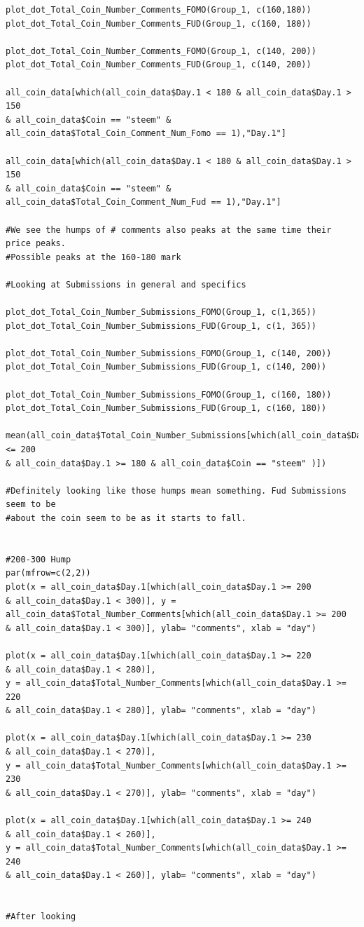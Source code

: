 \documentclass[12pt]{article}
\begin{document}
{\begin{verbatim}
plot_dot_Total_Coin_Number_Comments_FOMO(Group_1, c(160,180))
plot_dot_Total_Coin_Number_Comments_FUD(Group_1, c(160, 180))

plot_dot_Total_Coin_Number_Comments_FOMO(Group_1, c(140, 200))
plot_dot_Total_Coin_Number_Comments_FUD(Group_1, c(140, 200))

all_coin_data[which(all_coin_data$Day.1 < 180 & all_coin_data$Day.1 > 150 
& all_coin_data$Coin == "steem" & all_coin_data$Total_Coin_Comment_Num_Fomo == 1),"Day.1"]

all_coin_data[which(all_coin_data$Day.1 < 180 & all_coin_data$Day.1 > 150 
& all_coin_data$Coin == "steem" & all_coin_data$Total_Coin_Comment_Num_Fud == 1),"Day.1"]

#We see the humps of # comments also peaks at the same time their price peaks. 
#Possible peaks at the 160-180 mark

#Looking at Submissions in general and specifics

plot_dot_Total_Coin_Number_Submissions_FOMO(Group_1, c(1,365))
plot_dot_Total_Coin_Number_Submissions_FUD(Group_1, c(1, 365))

plot_dot_Total_Coin_Number_Submissions_FOMO(Group_1, c(140, 200))
plot_dot_Total_Coin_Number_Submissions_FUD(Group_1, c(140, 200))

plot_dot_Total_Coin_Number_Submissions_FOMO(Group_1, c(160, 180))
plot_dot_Total_Coin_Number_Submissions_FUD(Group_1, c(160, 180))

mean(all_coin_data$Total_Coin_Number_Submissions[which(all_coin_data$Day.1 <= 200 
& all_coin_data$Day.1 >= 180 & all_coin_data$Coin == "steem" )])

#Definitely looking like those humps mean something. Fud Submissions seem to be 
#about the coin seem to be as it starts to fall.


#200-300 Hump
par(mfrow=c(2,2))
plot(x = all_coin_data$Day.1[which(all_coin_data$Day.1 >= 200 
& all_coin_data$Day.1 < 300)], y = 
all_coin_data$Total_Number_Comments[which(all_coin_data$Day.1 >= 200 
& all_coin_data$Day.1 < 300)], ylab= "comments", xlab = "day")

plot(x = all_coin_data$Day.1[which(all_coin_data$Day.1 >= 220 
& all_coin_data$Day.1 < 280)], 
y = all_coin_data$Total_Number_Comments[which(all_coin_data$Day.1 >= 220 
& all_coin_data$Day.1 < 280)], ylab= "comments", xlab = "day")

plot(x = all_coin_data$Day.1[which(all_coin_data$Day.1 >= 230 
& all_coin_data$Day.1 < 270)], 
y = all_coin_data$Total_Number_Comments[which(all_coin_data$Day.1 >= 230 
& all_coin_data$Day.1 < 270)], ylab= "comments", xlab = "day")

plot(x = all_coin_data$Day.1[which(all_coin_data$Day.1 >= 240 
& all_coin_data$Day.1 < 260)], 
y = all_coin_data$Total_Number_Comments[which(all_coin_data$Day.1 >= 240 
& all_coin_data$Day.1 < 260)], ylab= "comments", xlab = "day")


#After looking
\end{verbatim} }
\end{document}
